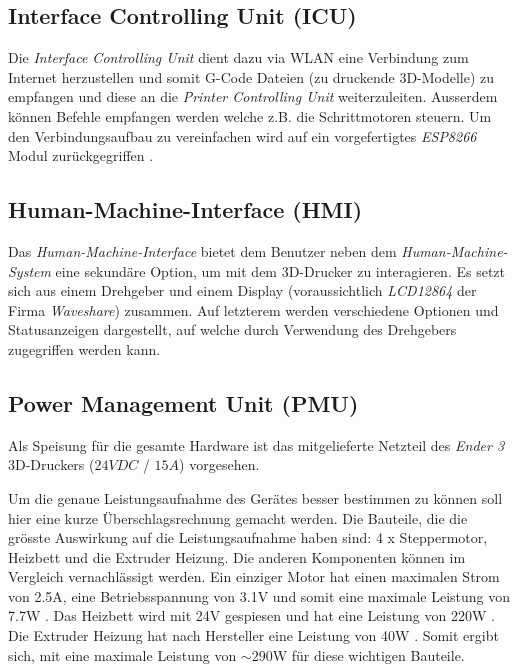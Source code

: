 \subsection{Interface Controlling Unit (ICU)}\label{subsec:ICU}
Die \textit{Interface Controlling Unit} dient dazu via WLAN eine Verbindung zum Internet herzustellen und somit G-Code Dateien (zu druckende 3D-Modelle) zu empfangen und diese an die \textit{Printer Controlling Unit} weiterzuleiten. Ausserdem können Befehle empfangen werden welche z.B. die Schrittmotoren steuern. Um den Verbindungsaufbau zu vereinfachen wird auf ein vorgefertigtes \textit{ESP8266} Modul zurückgegriffen \cite{ESP8266_spezifiaktion}.


\subsection{Human-Machine-Interface (HMI)}\label{subsec:HMI}
Das \textit{Human-Machine-Interface} bietet dem Benutzer neben dem \textit{Human-Machine-System} eine sekundäre Option, um mit dem 3D-Drucker zu interagieren. Es setzt sich aus einem Drehgeber und einem Display (voraussichtlich \textit{LCD12864} der Firma \textit{Waveshare}) zusammen. Auf letzterem werden verschiedene Optionen und Statusanzeigen dargestellt, auf welche durch Verwendung des Drehgebers zugegriffen werden kann.


\subsection{Power Management Unit (PMU)}\label{subsec:PMU}
Als Speisung für die gesamte Hardware ist das mitgelieferte Netzteil des \textit{Ender 3} 3D-Druckers ($24 VDC$ / $15A$) vorgesehen. 

Um die genaue Leistungsaufnahme des Gerätes besser bestimmen zu können soll hier eine kurze Überschlagsrechnung gemacht werden. Die Bauteile, die die grösste Auswirkung auf die Leistungsaufnahme haben sind: 4 x Steppermotor, Heizbett und die Extruder Heizung. Die anderen Komponenten können im Vergleich vernachlässigt werden. Ein einziger Motor hat einen maximalen Strom von 2.5A, eine Betriebsspannung von 3.1V und somit eine maximale Leistung von 7.7W \cite{steppermotor}. Das Heizbett wird mit 24V gespiesen und hat eine Leistung von 220W \cite{Heizbett_Ender3}.
Die Extruder Heizung hat nach Hersteller eine Leistung von 40W \cite{Extruder_Heizung}. Somit ergibt sich, mit eine maximale Leistung von $\sim290$W für diese wichtigen Bauteile.

